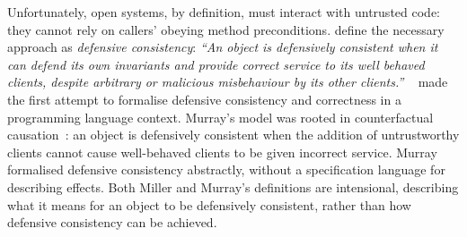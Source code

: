 





Unfortunately, open systems, by definition, must interact with
untrusted code: they cannot rely on callers' obeying method
preconditions. 
\cite{miller-esop2013,MillerPhD} define the necessary approach as
\textit{defensive consistency}: \textit{``An object is defensively
  consistent when it can defend its own invariants and provide correct
  service to its well behaved clients, despite arbitrary or malicious
  misbehaviour by its other clients.''}
~\cite{Murray10dphil} made the first attempt to formalise defensive consistency and
 correctness in a programming language context.  Murray's model was rooted in
counterfactual causation~\cite{Lewis_73}: an object is defensively
consistent when the addition of untrustworthy clients cannot cause
well-behaved clients to be given incorrect service.  Murray formalised
defensive consistency %
abstractly, 
without a specification language for describing effects.
Both Miller and
Murray's definitions are intensional, describing what it means for an
object to be defensively consistent, rather than how defensive
consistency can be achieved.





